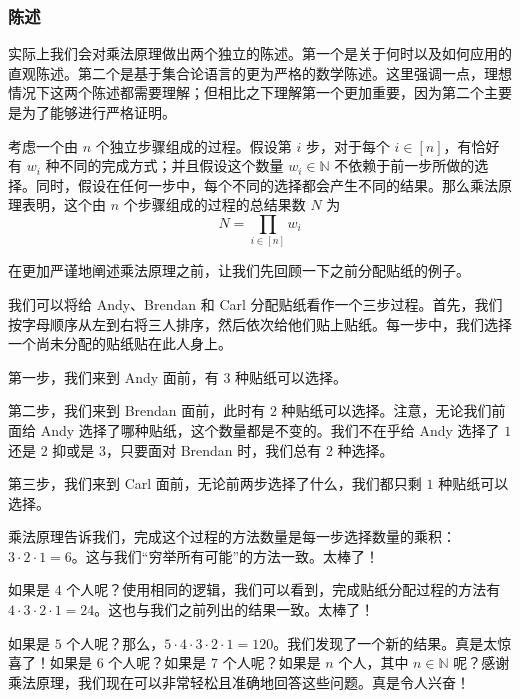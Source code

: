 \subsubsection*{陈述}

实际上我们会对乘法原理做出两个独立的陈述。第一个是关于何时以及如何应用的直观陈述。第二个是基于集合论语言的更为严格的数学陈述。这里强调一点，理想情况下这两个陈述都需要理解；但相比之下理解第一个更加重要，因为第二个主要是为了能够进行严格证明。

\begin{proposition}
    考虑一个由 $n$ 个独立步骤组成的过程。假设第 $i$ 步，对于每个 $i \in [n]$，有恰好有 $w_i$ 种不同的完成方式；并且假设这个数量 $w_i \in \mathbb{N}$ 不依赖于前一步所做的选择。同时，假设在任何一步中，每个不同的选择都会产生不同的结果。那么乘法原理表明，这个由 $n$ 个步骤组成的过程的总结果数 $N$ 为
    \[N = \prod_{i \in [n]} w_i\]
\end{proposition}

在更加严谨地阐述乘法原理之前，让我们先回顾一下之前分配贴纸的例子。\\

\begin{example}
    我们可以将给 Andy、Brendan 和 Carl 分配贴纸看作一个三步过程。首先，我们按字母顺序从左到右将三人排序，然后依次给他们贴上贴纸。每一步中，我们选择一个尚未分配的贴纸贴在此人身上。

    第一步，我们来到 Andy 面前，有 $3$ 种贴纸可以选择。

    第二步，我们来到 Brendan 面前，此时有 $2$ 种贴纸可以选择。注意，无论我们前面给 Andy 选择了哪种贴纸，这个数量都是不变的。我们不在乎给 Andy 选择了 $1$ 还是 $2$ 抑或是 $3$，只要面对 Brendan 时，我们总有 $2$ 种选择。

    第三步，我们来到 Carl 面前，无论前两步选择了什么，我们都只剩 $1$ 种贴纸可以选择。

    乘法原理告诉我们，完成这个过程的方法数量是每一步选择数量的乘积：$3 \cdot 2 \cdot 1 = 6$。这与我们``穷举所有可能''的方法一致。太棒了！

    如果是 $4$ 个人呢？使用相同的逻辑，我们可以看到，完成贴纸分配过程的方法有 $4 \cdot 3 \cdot 2 \cdot 1 = 24$。这也与我们之前列出的结果一致。太棒了！

    如果是 $5$ 个人呢？那么，$5 \cdot 4 \cdot 3 \cdot 2 \cdot 1 = 120$。我们发现了一个新的结果。真是太惊喜了！如果是 $6$ 个人呢？如果是 $7$ 个人呢？如果是 $n$ 个人，其中 $n \in \mathbb{N}$ 呢？感谢乘法原理，我们现在可以非常轻松且准确地回答这些问题。真是令人兴奋！
\end{example}

